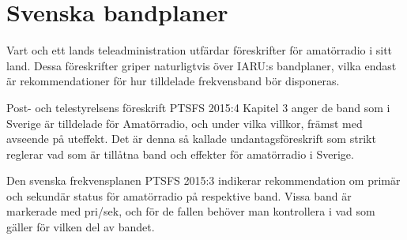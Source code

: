 \chapter{Svenska bandplaner}
\label{svenska bandplaner}

Vart och ett lands teleadministration utfärdar föreskrifter för amatörradio
i sitt land.
Dessa föreskrifter griper naturligtvis över IARU:s bandplaner, vilka endast
är rekommendationer för hur tilldelade frekvensband bör disponeras.

Post- och telestyrelsens föreskrift PTSFS 2015:4 \cite{PTSFS2015:4} Kapitel 3
anger de band som i Sverige är tilldelade för Amatörradio, och under vilka
villkor, främst med avseende på uteffekt.
Det är denna så kallade undantagsföreskrift som strikt reglerar vad som är
tillåtna band och effekter för amatörradio i Sverige.

Den svenska frekvensplanen PTSFS 2015:3 \cite{PTSFS2015:3} indikerar
rekommendation om primär och sekundär status för amatörradio på respektive
band.
Vissa band är markerade med pri/sek, och för de fallen behöver man
kontrollera i \cite{PTSFS2015:3} vad som gäller för vilken del av bandet.

